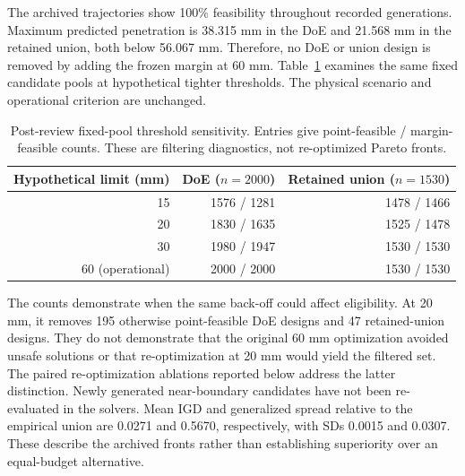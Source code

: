 \documentclass[12pt]{elsarticle}
\begin{document}
The archived trajectories show 100\% feasibility throughout recorded generations. Maximum predicted penetration is 38.315 mm in the DoE and 21.568 mm in the retained union, both below 56.067 mm. Therefore, no DoE or union design is removed by adding the frozen margin at 60 mm. Table~\ref{tab:threshold} examines the same fixed candidate pools at hypothetical tighter thresholds. The physical scenario and operational criterion are unchanged.
\begin{table}[H]\centering\small
\caption{Post-review fixed-pool threshold sensitivity. Entries give point-feasible / margin-feasible counts. These are filtering diagnostics, not re-optimized Pareto fronts.}\label{tab:threshold}
\begin{tabular}{@{}rrr@{}}\toprule
Hypothetical limit (mm)&DoE ($n=2000$)&Retained union ($n=1530$)\\\midrule
15&1576 / 1281&1478 / 1466\\
20&1830 / 1635&1525 / 1478\\
30&1980 / 1947&1530 / 1530\\
60 (operational)&2000 / 2000&1530 / 1530\\\bottomrule
\end{tabular}\end{table}
The counts demonstrate when the same back-off could affect eligibility. At 20 mm, it removes 195 otherwise point-feasible DoE designs and 47 retained-union designs. They do not demonstrate that the original 60 mm optimization avoided unsafe solutions or that re-optimization at 20 mm would yield the filtered set. The paired re-optimization ablations reported below address the latter distinction. Newly generated near-boundary candidates have not been re-evaluated in the solvers. Mean IGD and generalized spread relative to the empirical union are 0.0271 and 0.5670, respectively, with SDs 0.0015 and 0.0307. These describe the archived fronts rather than establishing superiority over an equal-budget alternative.
\end{document}
